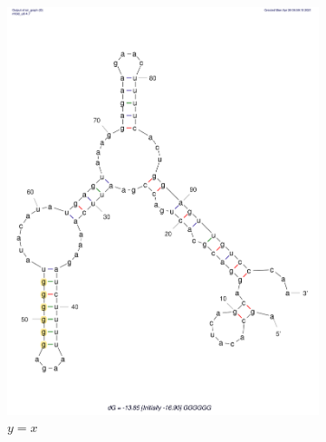 \begin{figure}
     \centering
     \begin{subfigure}[b]{0.49\textwidth}
         \centering
         \includegraphics[scale=0.25]{plots/Supplementary/Structure_GGGGGG.pdf}
         \caption{$y=x$}
         \label{fig:GGGGGG}
     \end{subfigure}
     \hfill
     \begin{subfigure}[b]{0.49\textwidth}
         \centering

\end{subfigure}
\end{figure}
